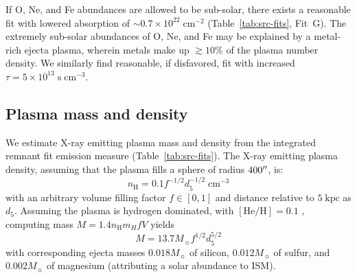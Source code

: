 \documentclass[preprint2,tighten,trackchanges]{aastex6}
\newcommand*{\mt}{\mathrm}
\newcommand*{\unit}[1]{\;\mt{#1}}  %
\newcommand*{\abt}{\mathord{\sim}} %
\newcommand*{\nH}{N_{\mathrm{H}}}
\newcommand*{\nHUnits}{\times 10^{22} \unit{cm^{-2}}}
\newcommand*{\TauUnits}{\unit{s\;cm^{-3}}}
\begin{document}

If O, Ne, and Fe abundances are allowed to be sub-solar, there exists a
reasonable fit with lowered absorption of $\abt 0.7 \nHUnits$
(Table~\ref{tab:src-fits}, Fit~G).
The extremely sub-solar abundances of O, Ne, and Fe may be explained by a
metal-rich ejecta plasma, wherein metals make up $\gtrsim 10\%$ of the plasma
number density.
We similarly find reasonable, if disfavored, fit with increased $\tau = 5
\times 10^{13} \TauUnits$.


\subsection{Plasma mass and density}

We estimate X-ray emitting plasma mass and density from the integrated remnant
fit emission measure (Table~\ref{tab:src-fits}).
The X-ray emitting plasma density, assuming that the plasma fills a sphere of
radius $400\mbox{$^{\prime\prime}$}$, is:
\begin{equation} \label{eq:density}
    n_{\mt{H}} = 0.1 f^{-1/2} d_{5}^{-1/2} \unit{cm^{-3}}
\end{equation}
with an arbitrary volume filling factor $f \in [0,1]$ and distance relative to
$5 \unit{kpc}$ as $d_{5}$.
Assuming the plasma is hydrogen dominated, with $[\mt{He}/\mt{H}] = 0.1$
\citep{wilms2000}, computing mass $M = 1.4 n_{\mt{H}} m_{H} f V$ yields
\[
    M = 13.7 M_{\sun} f^{1/2} d_{5}^{5/2}
\]
with corresponding ejecta masses $0.018 M_{\sun}$ of silicon, $0.012 M_{\sun}$
of sulfur, and $0.002 M_{\sun}$ of magnesium (attributing a solar abundance to
ISM).
\end{document}
